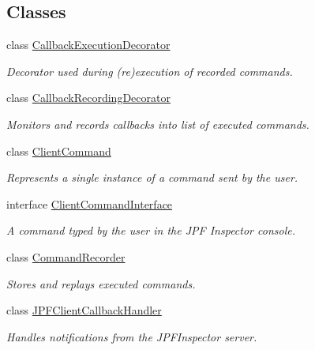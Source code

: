 \subsection*{Classes}
\begin{DoxyCompactItemize}
\item 
class \hyperlink{classgov_1_1nasa_1_1jpf_1_1inspector_1_1client_1_1_callback_execution_decorator}{Callback\+Execution\+Decorator}
\begin{DoxyCompactList}\small\item\em Decorator used during (re)execution of recorded commands. \end{DoxyCompactList}\item 
class \hyperlink{classgov_1_1nasa_1_1jpf_1_1inspector_1_1client_1_1_callback_recording_decorator}{Callback\+Recording\+Decorator}
\begin{DoxyCompactList}\small\item\em Monitors and records callbacks into list of executed commands. \end{DoxyCompactList}\item 
class \hyperlink{classgov_1_1nasa_1_1jpf_1_1inspector_1_1client_1_1_client_command}{Client\+Command}
\begin{DoxyCompactList}\small\item\em Represents a single instance of a command sent by the user. \end{DoxyCompactList}\item 
interface \hyperlink{interfacegov_1_1nasa_1_1jpf_1_1inspector_1_1client_1_1_client_command_interface}{Client\+Command\+Interface}
\begin{DoxyCompactList}\small\item\em A command typed by the user in the J\+PF Inspector console. \end{DoxyCompactList}\item 
class \hyperlink{classgov_1_1nasa_1_1jpf_1_1inspector_1_1client_1_1_command_recorder}{Command\+Recorder}
\begin{DoxyCompactList}\small\item\em Stores and replays executed commands. \end{DoxyCompactList}\item 
class \hyperlink{classgov_1_1nasa_1_1jpf_1_1inspector_1_1client_1_1_j_p_f_client_callback_handler}{J\+P\+F\+Client\+Callback\+Handler}
\begin{DoxyCompactList}\small\item\em Handles notifications from the J\+P\+F\+Inspector server. \end{DoxyCompactList}\item 

\end{DoxyCompactItemize}
